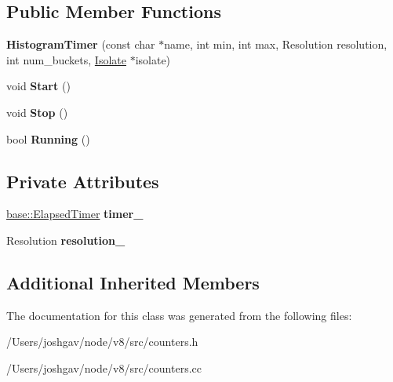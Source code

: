 \subsection*{Public Member Functions}
\begin{DoxyCompactItemize}
\item 
{\bfseries Histogram\+Timer} (const char $\ast$name, int min, int max, Resolution resolution, int num\+\_\+buckets, \hyperlink{classv8_1_1internal_1_1_isolate}{Isolate} $\ast$isolate)\hypertarget{classv8_1_1internal_1_1_histogram_timer_a9f6a3ac0d8a199722038d1374e39456c}{}\label{classv8_1_1internal_1_1_histogram_timer_a9f6a3ac0d8a199722038d1374e39456c}

\item 
void {\bfseries Start} ()\hypertarget{classv8_1_1internal_1_1_histogram_timer_ac979127ffb542e53c66dc5d700f4bd9e}{}\label{classv8_1_1internal_1_1_histogram_timer_ac979127ffb542e53c66dc5d700f4bd9e}

\item 
void {\bfseries Stop} ()\hypertarget{classv8_1_1internal_1_1_histogram_timer_a890953c74235f44308230d445ebf9f1b}{}\label{classv8_1_1internal_1_1_histogram_timer_a890953c74235f44308230d445ebf9f1b}

\item 
bool {\bfseries Running} ()\hypertarget{classv8_1_1internal_1_1_histogram_timer_ae7e03caff0533d469e5abfcf4da70da2}{}\label{classv8_1_1internal_1_1_histogram_timer_ae7e03caff0533d469e5abfcf4da70da2}

\end{DoxyCompactItemize}
\subsection*{Private Attributes}
\begin{DoxyCompactItemize}
\item 
\hyperlink{classv8_1_1base_1_1_elapsed_timer}{base\+::\+Elapsed\+Timer} {\bfseries timer\+\_\+}\hypertarget{classv8_1_1internal_1_1_histogram_timer_a8beb0a75a3580295787cf6a08f9fb962}{}\label{classv8_1_1internal_1_1_histogram_timer_a8beb0a75a3580295787cf6a08f9fb962}

\item 
Resolution {\bfseries resolution\+\_\+}\hypertarget{classv8_1_1internal_1_1_histogram_timer_a64ebc565d7d3996b2fbc905d297239c0}{}\label{classv8_1_1internal_1_1_histogram_timer_a64ebc565d7d3996b2fbc905d297239c0}

\end{DoxyCompactItemize}
\subsection*{Additional Inherited Members}


The documentation for this class was generated from the following files\+:\begin{DoxyCompactItemize}
\item 
/\+Users/joshgav/node/v8/src/counters.\+h\item 
/\+Users/joshgav/node/v8/src/counters.\+cc\end{DoxyCompactItemize}

